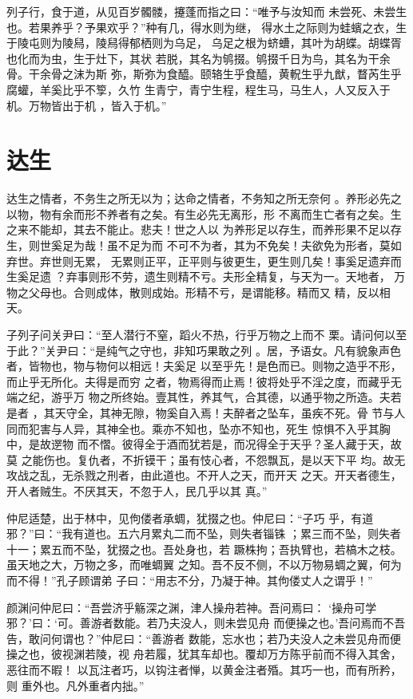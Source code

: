 \documentclass[12pt,UTF8]{ctexbook}
\begin{document}
列子行，食于道，从见百岁髑髅，攓蓬而指之曰：“唯予与汝知而 未尝死、未尝生也。若果养乎？予果欢乎？”种有几，得水则为继， 得水土之际则为蛙蠙之衣，生于陵屯则为陵舄，陵舄得郁栖则为乌足， 乌足之根为蛴螬，其叶为胡蝶。胡蝶胥也化而为虫，生于灶下，其状 若脱，其名为鸲掇。鸲掇千日为鸟，其名为干余骨。干余骨之沫为斯 弥，斯弥为食醯。颐辂生乎食醯，黄軦生乎九猷，瞀芮生乎腐蠸，羊奚比乎不箰，久竹 生青宁，青宁生程，程生马，马生人，人又反入于机。万物皆出于机 ，皆入于机。”
\section{达生}

达生之情者，不务生之所无以为；达命之情者，不务知之所无奈何 。养形必先之以物，物有余而形不养者有之矣。有生必先无离形，形 不离而生亡者有之矣。生之来不能却，其去不能止。悲夫！世之人以 为养形足以存生，而养形果不足以存生，则世奚足为哉！虽不足为而 不可不为者，其为不免矣！夫欲免为形者，莫如弃世。弃世则无累， 无累则正平，正平则与彼更生，更生则几矣！事奚足遗弃而生奚足遗 ？弃事则形不劳，遗生则精不亏。夫形全精复，与天为一。天地者， 万物之父母也。合则成体，散则成始。形精不亏，是谓能移。精而又 精，反以相天。

子列子问关尹曰：“至人潜行不窒，蹈火不热，行乎万物之上而不 栗。请问何以至于此？”关尹曰：“是纯气之守也，非知巧果敢之列 。居，予语女。凡有貌象声色者，皆物也，物与物何以相远！夫奚足 以至乎先！是色而已。则物之造乎不形，而止乎无所化。夫得是而穷 之者，物焉得而止焉！彼将处乎不淫之度，而藏乎无端之纪，游乎万 物之所终始。壹其性，养其气，合其德，以通乎物之所造。夫若是者 ，其天守全，其神无隙，物奚自入焉！夫醉者之坠车，虽疾不死。骨 节与人同而犯害与人异，其神全也。乘亦不知也，坠亦不知也，死生 惊惧不入乎其胸中，是故遻物 而不慴。彼得全于酒而犹若是，而况得全于天乎？圣人藏于天，故莫 之能伤也。复仇者，不折镆干；虽有忮心者，不怨飘瓦，是以天下平 均。故无攻战之乱，无杀戮之刑者，由此道也。不开人之天，而开天 之天。开天者德生，开人者贼生。不厌其天，不忽于人，民几乎以其 真。”

仲尼适楚，出于林中，见佝偻者承蜩，犹掇之也。仲尼曰：“子巧 乎，有道邪？”曰：“我有道也。五六月累丸二而不坠，则失者锱铢 ；累三而不坠，则失者十一；累五而不坠，犹掇之也。吾处身也，若 蹶株拘；吾执臂也，若槁木之枝。虽天地之大，万物之多，而唯蜩翼 之知。吾不反不侧，不以万物易蜩之翼，何为而不得！”孔子顾谓弟 子曰：“用志不分，乃凝于神。其佝偻丈人之谓乎！”

颜渊问仲尼曰：“吾尝济乎觞深之渊，津人操舟若神。吾问焉曰： ‘操舟可学邪？’曰：‘可。善游者数能。若乃夫没人，则未尝见舟 而便操之也。’吾问焉而不吾告，敢问何谓也？”仲尼曰：“善游者 数能，忘水也；若乃夫没人之未尝见舟而便操之也，彼视渊若陵，视 舟若履，犹其车却也。覆却万方陈乎前而不得入其舍，恶往而不暇！ 以瓦注者巧，以钩注者惮，以黄金注者殙。其巧一也，而有所矜，则 重外也。凡外重者内拙。”
\end{document}
